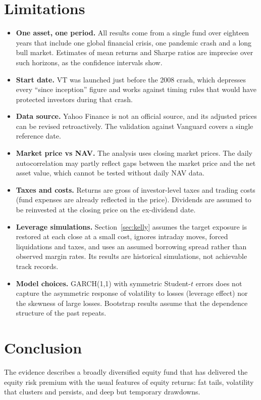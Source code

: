 \documentclass[11pt,a4paper]{article}
\newcommand{\keep}[1]{\Needspace{#1\baselineskip}}
\begin{document}
\section{Limitations}
\begin{itemize}[leftmargin=1.2em,itemsep=0.3em,topsep=0.2em]
  \item \textbf{One asset, one period.} All results come from a single fund over eighteen years that include one global financial crisis, one pandemic crash and a long bull market. Estimates of mean returns and Sharpe ratios are imprecise over such horizons, as the confidence intervals show.
  \item \textbf{Start date.} VT was launched just before the 2008 crash, which depresses every ``since inception'' figure and works against timing rules that would have protected investors during that crash.
  \item \textbf{Data source.} Yahoo Finance is not an official source, and its adjusted prices can be revised retroactively. The validation against Vanguard covers a single reference date.
  \item \textbf{Market price vs NAV.} The analysis uses closing market prices. The daily autocorrelation may partly reflect gaps between the market price and the net asset value, which cannot be tested without daily NAV data.
  \item \textbf{Taxes and costs.} Returns are gross of investor-level taxes and trading costs (fund expenses are already reflected in the price). Dividends are assumed to be reinvested at the closing price on the ex-dividend date.
  \item \textbf{Leverage simulations.} Section~\ref{sec:kelly} assumes the target exposure is restored at each close at a small cost, ignores intraday moves, forced liquidations and taxes, and uses an assumed borrowing spread rather than observed margin rates. Its results are historical simulations, not achievable track records.
  \item \textbf{Model choices.} GARCH(1,1) with symmetric Student-$t$ errors does not capture the asymmetric response of volatility to losses (leverage effect) nor the skewness of large losses. Bootstrap results assume that the dependence structure of the past repeats.
\end{itemize}

\keep{12}
\section{Conclusion}
The evidence describes a broadly diversified equity fund that has delivered the equity risk premium with the usual features of equity returns: fat tails, volatility that clusters and persists, and deep but temporary drawdowns.
\end{document}
